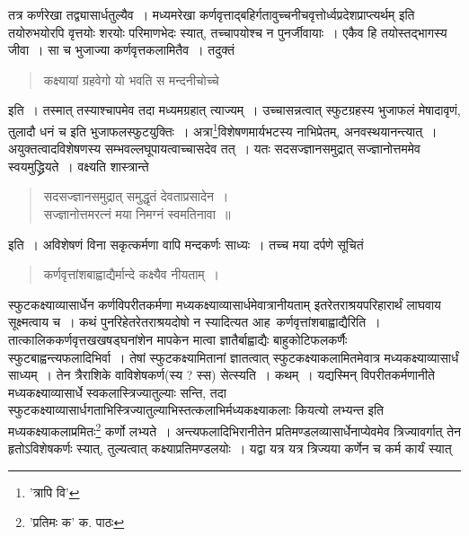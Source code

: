 \documentclass[11pt, openany]{book}
\begin{document}
{{{{{\vspace{0.3cm}
\noindent तत्र कर्णरेखा तद्व्यासार्धतुल्यैव~। मध्यमरेखा कर्णवृत्ताद्बहिर्गतावुच्चनीचवृत्तोर्ध्वप्रदेशप्राप्त्यर्थम् इति तयोरुभयोरपि वृत्तयोः शरयोः
परिमाणभेदः स्यात्, तच्चापयोश्च न पुनर्जीवायाः~। एकैव हि तयोस्तद्भागस्य जीवा~। सा च भुजाज्या कर्णवृत्तकलामितैव~। तदुक्तं\textendash

\begin{quote}
{\qt कक्ष्यायां ग्रहवेगो यो भवति स मन्दनीचोच्चे}
\end{quote}

\noindent इति~। तस्मात् तस्याश्चापमेव तदा मध्यमग्रहात् त्याज्यम्~। उच्चासन्नत्वात् स्फुटग्रहस्य भुजाफलं मेषादावृणं, तुलादौ धनं च इति भुजाफलस्फुटयुक्तिः~। अत्रा\renewcommand{\thefootnote}{१}\footnote{'त्रापि वि'}विशेषणमार्यभटस्य नाभिप्रेतम्, अनवस्थयानन्त्यात्~। अयुक्तत्वादविशेषणस्य सम्भवल्लघूपायत्वाच्चासदेव तत्~। यतः सदसज्ज्ञानसमुद्रात् सज्ज्ञानोत्तममेव स्वयमुद्ध्रियते~। वक्ष्यति शास्त्रान्ते\textendash

\begin{quote}
{\qt सदसज्ज्ञानसमुद्रात् समुद्धृतं देवताप्रसादेन~।\\
सज्ज्ञानोत्तमरत्नं मया निमग्नं स्वमतिनावा~॥}
\end{quote}

\noindent इति~। अविशेषणं विना सकृत्कर्मणा वापि मन्दकर्णः साध्यः~। तच्च मया दर्पणे सूचितं\textendash

\begin{quote}
{\qt कर्णवृत्तांशबाह्वाद्यैर्मान्दे कक्ष्यैव नीयताम्~।}
\end{quote}

स्फुटकक्ष्याव्यासार्धेन कर्णविपरीतकर्मणा मध्यकक्ष्याव्यासार्धमेवात्रानीयताम् इतरेतराश्रयपरिहारार्थं लाघवाय सूक्ष्मत्वाय च~। कथं पुनरिहेतरेतराश्रयदोषो न स्यादित्यत आह\textendash\ कर्णवृत्तांशबाह्वाद्यैरिति~। तात्कालिककर्णवृत्तखखषड्घनांशेन मापकेन मात्वा ज्ञातैर्बाह्वाद्यैः बाहुकोटिफलकर्णैः स्फुटबाह्वन्त्यफलादिभिर्वा~। तेषां स्फुटकक्ष्यामितानां ज्ञातत्वात् स्फुटकक्ष्याकलामितमेवात्र मध्यकक्ष्याव्यासार्धं साध्यम्~। तेन त्रैराशिके वाविशेषकर्ण(स्य ? स्स) सेत्स्यति~। कथम्~। यद्यस्मिन् विपरीतकर्मणानीते मध्यकक्ष्याव्यासार्धे स्वकलास्त्रिज्यातुल्याः सन्ति, तदा स्फुटकक्ष्याव्यासार्धगताभिस्त्रिज्यातुल्याभिस्तत्कलाभिर्मध्यकक्ष्याकलाः कियत्यो लभ्यन्त इति
मध्यकक्ष्याकलाप्रमितः\renewcommand{\thefootnote}{२}\footnote{'प्रतिमः क' क. पाठः} कर्णो लभ्यते~। अन्त्यफलादिभिरानीतेन प्रतिमण्डलव्यासार्धेनाप्येवमेव त्रिज्यावर्गात् तेन हृतोऽविशेषकर्णः स्यात्, तुल्यत्वात् कक्ष्याप्रतिमण्डलयोः~। यद्वा यत्र यत्र त्रिज्यया कर्णेन च कर्म कार्यं स्यात्

}}}}}
\end{document}
